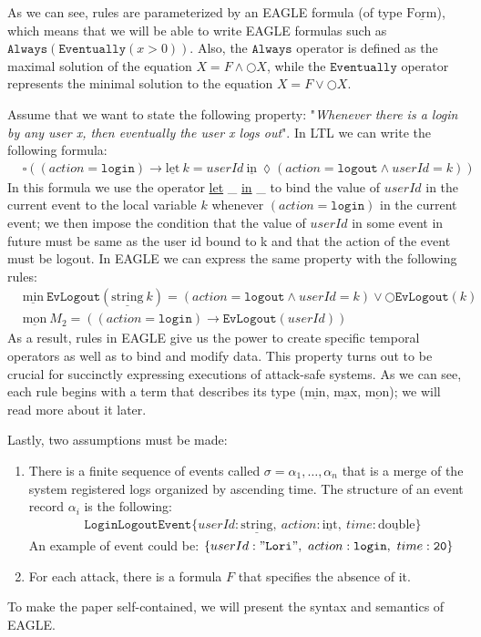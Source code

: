 \documentclass[english]{article}
\begin{document}
As we can see, rules are parameterized by an EAGLE formula (of type $\underline{\text{Form}}$), which means that we will be able to write EAGLE formulas such as $\mathtt{Always}(\mathtt{Eventually}(x>0))$. Also, the $\mathtt{Always}$ operator is defined as the maximal solution of the equation $X=F\land \bigcirc X$, while the $\mathtt{Eventually}$ operator represents the minimal solution to the equation $X=F\lor \bigcirc X$.

Assume that we want to state the following property: "\textit{Whenever there is a login by any user x, then eventually the user x logs out}". In LTL we can write the following formula: 
\begin{align*}
    & \square{((action = \mathtt{login})\rightarrow \underline{\text{let}}\ k=userId\ \underline{\text{in}}\ \lozenge(action = \mathtt{logout}\land userId = k))}
\end{align*}
In this formula we use the operator \underline{let} \_ \underline{in} \_ to bind the value of $userId$ in the current event to the local variable $k$ whenever $(action = \mathtt{login})$ in the current event; we then impose the condition that the value of $userId$ in some event in future must be same as the user id bound to k and that the action of the event must be logout.
In EAGLE we can express the same property with the following rules:
\begin{align*}
    & \underline{\text{min}}\ \mathtt{EvLogout}(\underline{\text{string}}\ k) = (action = \mathtt{logout}\land userId = k) \lor \bigcirc \mathtt{EvLogout}(k) \\
    & \underline{\text{mon}}\ M_2 = ((action = \mathtt{login})\rightarrow \mathtt{EvLogout}(userId)) 
\end{align*}
As a result, rules in EAGLE give us the power to create specific temporal operators as well as to bind and modify data. This property turns out to be crucial for succinctly expressing executions of attack-safe systems. As we can see, each rule begins with a term that describes its type ($\underline{\text{min}}$, $\underline{\text{max}}$, $\underline{\text{mon}}$); we will read more about it later.

Lastly, two assumptions must be made:\begin{enumerate}
    \item There is a finite sequence of events called $\sigma=\alpha_{1},\ldots ,\alpha_{n}$ that is a merge of the system registered logs organized by ascending time. 
    The structure of an event record $\alpha_i$ is the following:
    \begin{align*}
        & \mathtt{LoginLogoutEvent}\{userId:\underline{\text{string}},\ action: \underline{\text{int}},\ time: \underline{\text{double}}\} 
    \end{align*}
    An example of event could be: $\{userId:\mathtt{"Lori"},\ action:\mathtt{login},\ time:\mathtt{20}\}$
    \item For each attack, there is a formula $F$ that specifies the absence of it.
\end{enumerate}
To make the paper self-contained, we will present the syntax and semantics of EAGLE.
\end{document}
